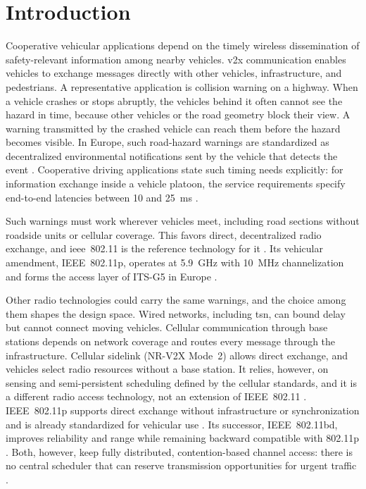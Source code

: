 \chapter{Introduction}
\label{chap:intro}

Cooperative vehicular applications depend on the timely wireless dissemination of safety-relevant information among nearby vehicles. \gls{v2x} communication enables vehicles to exchange messages directly with other vehicles, infrastructure, and pedestrians. A representative application is collision warning on a highway. When a vehicle crashes or stops abruptly, the vehicles behind it often cannot see the hazard in time, because other vehicles or the road geometry block their view. A warning transmitted by the crashed vehicle can reach them before the hazard becomes visible. In Europe, such road-hazard warnings are standardized as decentralized environmental notifications sent by the vehicle that detects the event \cite{etsi_en_302637_3}. Cooperative driving applications state such timing needs explicitly: for information exchange inside a vehicle platoon, the service requirements specify end-to-end latencies between 10 and 25~ms \cite{ts22186}.

Such warnings must work wherever vehicles meet, including road sections without roadside units or cellular coverage. This favors direct, decentralized radio exchange, and \gls{ieee}~802.11 is the reference technology for it \cite{jiang2008ieee80211p,IEEE80211}. Its vehicular amendment, IEEE~802.11p, operates at 5.9~GHz with 10~MHz channelization and forms the access layer of ITS-G5 in Europe \cite{jiang2008ieee80211p,etsi_en_302663}.

Other radio technologies could carry the same warnings, and the choice among them shapes the design space. Wired networks, including \gls{tsn}, can bound delay but cannot connect moving vehicles. Cellular communication through base stations depends on network coverage and routes every message through the infrastructure. Cellular sidelink (NR-V2X Mode~2) allows direct exchange, and vehicles select radio resources without a base station. It relies, however, on sensing and semi-persistent scheduling defined by the cellular standards, and it is a different radio access technology, not an extension of IEEE~802.11 \cite{CV2X_Sidelink_Allocation,naik2019ieee80211bd}. IEEE~802.11p supports direct exchange without infrastructure or synchronization and is already standardized for vehicular use \cite{jiang2008ieee80211p,etsi_en_302663}. Its successor, IEEE~802.11bd, improves reliability and range while remaining backward compatible with 802.11p \cite{naik2019ieee80211bd}. Both, however, keep fully distributed, contention-based channel access: there is no central scheduler that can reserve transmission opportunities for urgent traffic \cite{naik2019ieee80211bd}.

